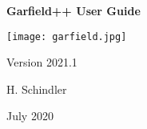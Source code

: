 \begin{titlepage}
  {
  \centering
  \sffamily
  \linespread{1.5}

  \vspace{3cm} 

  \huge{\textbf{Garfield++ User Guide}}

  \vspace{2cm}

  \texttt{[image: garfield.jpg]}

  \vspace{2cm}

  \large
  Version 2021.1

  \vspace{2cm}
  \large
  H. Schindler

  \vfill

  July 2020

  }
\end{titlepage}
